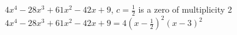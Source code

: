 {$4x^{4} - 28x^{3} + 61x^{2} - 42x + 9$, $c = \frac{1}{2}$ is a zero of multiplicity 2}
{$4x^{4} - 28x^{3} + 61x^{2} - 42x + 9 = 4\left(x - \frac{1}{2} \right)^{2}(x - 3)^{2}$}